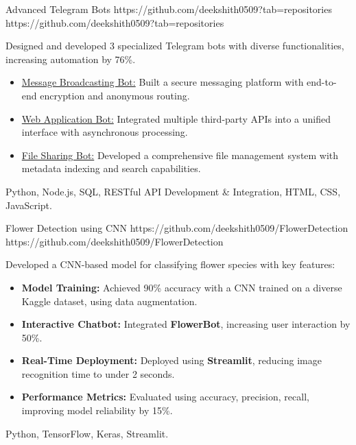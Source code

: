 \documentclass[a4paper,10pt]{article}
\begin{document}
\projectentry
{Advanced Telegram Bots}
{https://github.com/deekshith0509?tab=repositories}
{https://github.com/deekshith0509?tab=repositories}
{Designed and developed 3 specialized Telegram bots with diverse functionalities, increasing automation by 76\%.
\begin{itemize}
    \vspace{2pt}
    \item \href{https://github.com/deekshith0509/MessageBroadcasting_Bot}{Message Broadcasting Bot:} Built a secure messaging platform with end-to-end encryption and anonymous routing.
    \vspace{2pt}
    \item \href{https://github.com/deekshith0509/WebApplication_Bot}{Web Application Bot:} Integrated multiple third-party APIs into a unified interface with asynchronous processing.
    \vspace{2pt}
    \item \href{https://github.com/deekshith0509/Fileforwardbot}{File Sharing Bot:} Developed a comprehensive file management system with metadata indexing and search capabilities.
\end{itemize}
}{Python, Node.js, SQL, RESTful API Development \& Integration, HTML, CSS, JavaScript.}






\vspace{10pt}

\iffalse  %
\projectentry
{Flower Detection using CNN}
{https://github.com/deekshith0509/FlowerDetection}
{https://github.com/deekshith0509/FlowerDetection}
{Developed a CNN-based model for classifying flower species with key features:
\begin{itemize}
\item \textbf{Model Training:} Achieved 90\% accuracy with a CNN trained on a diverse Kaggle dataset, using data augmentation.
    \item \textbf{Interactive Chatbot:} Integrated \textbf{FlowerBot}, increasing user interaction by 50\%.
    \item \textbf{Real-Time Deployment:} Deployed using \textbf{Streamlit}, reducing image recognition time to under 2 seconds.
    \item \textbf{Performance Metrics:} Evaluated using accuracy, precision, recall, improving model reliability by 15\%.
\end{itemize}
}
{Python, TensorFlow, Keras, Streamlit.}
\end{document}
